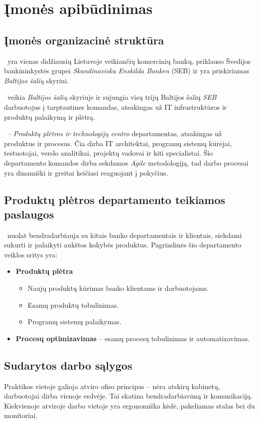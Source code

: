 \section{Įmonės apibūdinimas}

\subsection{Įmonės organizacinė struktūra}
\SEB~yra vienas didžiausių Lietuvoje veikiančių komercinių bankų, priklauso Švedijos bankininkystės grupei \textit{Skandinaviska Enskilda Banken} (SEB) ir yra priskiriamas \textit{Baltijos šalių} skyriui. 

\PDT~veikia \textit{Baltijos šalių} skyriuje ir sujungia visų trijų Baltijos šalių \textit{SEB} darbuotojus į tarptautines komandas, atsakingas už IT infrastruktūros ir produktų palaikymą ir plėtrą.

\PD~-- \textit{Produktų plėtros ir technologijų centro} departamentas, atsakingas už produktus ir procesus. Čia dirba IT architektai, programų sistemų kūrėjai, testuotojai, verslo analitikai, projektų vadovai ir kiti specialistai. Šio departamento komandos dirba sekdamos \textit{Agile} \cite{cohenIntroductionAgileMethods2004} metodologiją, tad darbo procesai yra dinamiški ir greitai keičiasi reaguojant į pokyčius.

\subsection{Produktų plėtros departamento teikiamos paslaugos}

\PD~nuolat bendradarbiauja su kitais banko departamentais ir klientais, siekdami sukurti ir palaikyti aukštos kokybės produktus. Pagrindinės šio departamento veiklos sritys yra:
\begin{itemize}
    \item \textbf{Produktų plėtra}
    \begin{itemize}
        \item Naujų produktų kūrimas banko klientams ir darbuotojams.
        \item Esamų produktų tobulinimas.
        \item Programų sistemų palaikymas.
    \end{itemize}
    \item \textbf{Procesų optimizavimas} -- esamų procesų tobulinimas ir automatizavimas.
\end{itemize}

\subsection{Sudarytos darbo sąlygos}
Praktikos vietoje galioja atviro ofiso  principas -- nėra atskirų kabinetų, darbuotojai dirba vienoje erdvėje. Tai skatina bendradarbiavimą ir komunikaciją. Kiekvienoje atviroje darbo vietoje yra ergonomiška kėdė, pakeliamas stalas bei du monitoriai.